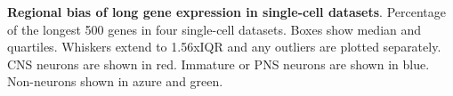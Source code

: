 \textbf{Regional bias of long gene expression in single-cell datasets}. Percentage of the longest 500 genes in four single-cell datasets. Boxes show median and quartiles. Whiskers extend to 1.56xIQR and any outliers are plotted separately. CNS neurons are shown in red. Immature or PNS neurons are shown in blue. Non-neurons shown in azure and green.


